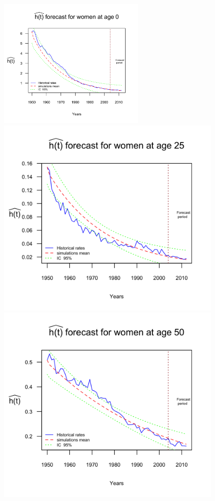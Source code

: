 \documentclass[smallextended]{svjour3}
\begin{document}
\begin{figure}[H]
    \includegraphics[width = 2.85in]{PlotWomenForecast0.png}
    \includegraphics{PlotWomenForecast25.png}
    \includegraphics{PlotWomenForecast50.png}

\end{figure}
\end{document}
